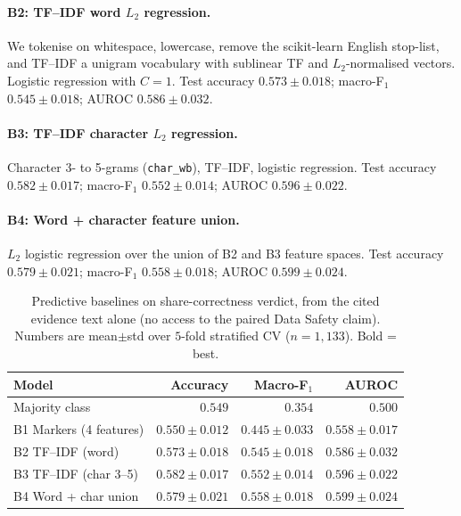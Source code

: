 \documentclass[11pt,a4paper]{article}
\begin{document}
\paragraph{B2: TF--IDF word $L_2$ regression.}
We tokenise on whitespace, lowercase, remove the scikit-learn English
stop-list, and TF--IDF a unigram vocabulary with sublinear TF and
$L_2$-normalised vectors. Logistic regression with $C=1$. Test
accuracy $0.573\pm0.018$; macro-F$_1$ $0.545\pm0.018$; AUROC
$0.586\pm0.032$.

\paragraph{B3: TF--IDF character $L_2$ regression.}
Character 3- to 5-grams (\texttt{char\_wb}), TF--IDF, logistic
regression. Test accuracy $0.582\pm0.017$; macro-F$_1$
$0.552\pm0.014$; AUROC $0.596\pm0.022$.

\paragraph{B4: Word + character feature union.}
$L_2$ logistic regression over the union of B2 and B3 feature
spaces. Test accuracy $0.579\pm0.021$; macro-F$_1$ $0.558\pm0.018$;
AUROC $0.599\pm0.024$.

\begin{table}[t]
\centering\small
\caption{Predictive baselines on share-correctness verdict, from the
cited evidence text alone (no access to the paired Data Safety
claim). Numbers are mean$\pm$std over $5$-fold stratified CV
($n=1{,}133$). Bold = best.}
\label{tab:baselines}
\begin{tabular}{lrrr}
\toprule
Model & Accuracy & Macro-F$_1$ & AUROC \\
\midrule
Majority class           & $0.549$ & $0.354$ & $0.500$ \\
B1 Markers (4 features)  & $0.550\pm0.012$ & $0.445\pm0.033$ & $0.558\pm0.017$ \\
B2 TF--IDF (word)        & $0.573\pm0.018$ & $0.545\pm0.018$ & $0.586\pm0.032$ \\
B3 TF--IDF (char 3--5)   & \textbf{$0.582\pm0.017$} & $0.552\pm0.014$ & \textbf{$0.596\pm0.022$} \\
B4 Word + char union     & $0.579\pm0.021$ & \textbf{$0.558\pm0.018$} & $0.599\pm0.024$ \\
\bottomrule
\end{tabular}
\end{table}
\end{document}
